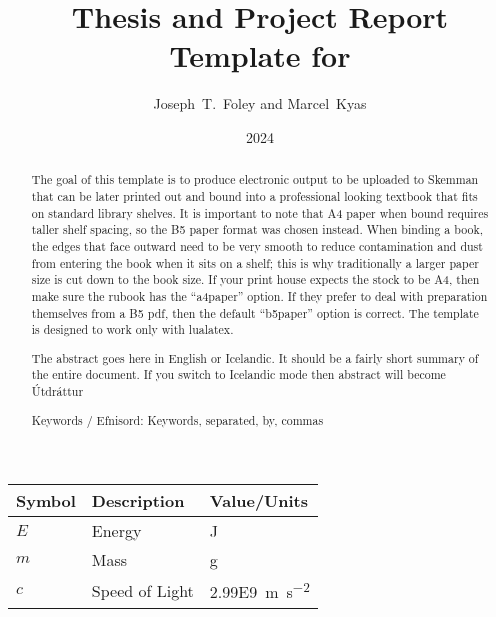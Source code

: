 \documentclass[showtrims, b5paper]{rubook}
\title{Thesis and Project Report Template for \theInstitution{}}
\author{Joseph~T.~Foley and Marcel~Kyas}
\date{2024}{11}{07}%
\begin{document}
\maketitle{}
\disableindents{}%
\copyrightpage{}



\tableofcontents{}
\listoffigures{}
\listoftables{}
\begin{tabular}{lll}\toprule
  Symbol &Description &Value/Units\\\midrule
  $E$ &Energy &\si{\joule}\\ %
  $m$ &Mass &\si{\gram}\\ %
  $c$ &Speed of Light &\SI{2.99E9}{\meter\per\square\second}\\\bottomrule
\end{tabular}

\enableindents{}%
\newpage
\begin{abstract}
  The goal of this template is to produce electronic output to be uploaded to Skemman that can be later printed out and bound into a professional looking textbook that fits on standard library shelves.
  It is important to note that A4 paper when bound requires taller shelf spacing, so the B5 paper format was chosen instead.
  When binding a book, the edges that face outward need to be very smooth to reduce contamination and dust from entering the book when it sits on a shelf; this is why traditionally a larger paper size is cut down to the book size.
  If your print house expects the stock to be A4, then make sure the rubook has the ``a4paper'' option.
  If they prefer to deal with preparation themselves from a B5 pdf, then the default ``b5paper'' option is correct.
  The template is designed to work only with lualatex.
  
  The abstract goes here in English or Icelandic.
  It should be a fairly short summary of the entire document.
  If you switch to Icelandic mode then abstract will become \'{U}tdr\'{a}ttur

  Keywords / Efnisord:  Keywords, separated, by, commas
\end{abstract}
\end{document}
